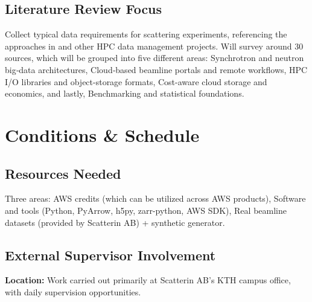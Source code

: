\documentclass{article}
\begin{document}
\subsection{Literature Review Focus}
Collect typical data requirements for scattering experiments, referencing the approaches in \cite{wang2018synchrotron, meyer2014store, moriyama2019public, kek2021aws, godoy2021efficient} and other HPC data management projects. Will survey around 30 sources, which will be grouped into five different areas: Synchrotron and neutron big‐data architectures, Cloud‐based beamline portals and remote workflows, HPC I/O libraries and object-storage formats, Cost-aware cloud storage and economics, and lastly, Benchmarking and statistical foundations.




\section{Conditions \& Schedule}

\subsection{Resources Needed}
Three areas: AWS credits (which can be utilized across AWS products), Software and tools (Python, PyArrow, h5py, zarr-python, AWS SDK), Real beamline datasets (provided by Scatterin AB) + synthetic generator.

\subsection{External Supervisor Involvement}
\textbf{Location:} Work carried out primarily at Scatterin AB’s KTH campus office, with daily supervision opportunities.
\end{document}

